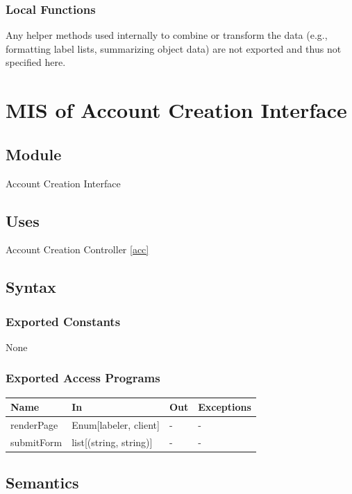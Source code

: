 \documentclass[12pt, titlepage]{article}
\begin{document}
    \subsubsection{Local Functions}
        Any helper methods used internally to combine or transform the data (e.g., formatting label lists, summarizing object data) are not exported and thus not specified here.


  
\section{MIS of Account Creation Interface} \label{aci}

\subsection{Module}

Account Creation Interface

\subsection{Uses}

Account Creation Controller \ref{acc}

\subsection{Syntax}

\subsubsection{Exported Constants}
None
\subsubsection{Exported Access Programs}

\begin{center}
\begin{tabular}{p{2cm} p{4cm} p{4cm} p{2cm}}
\hline
\textbf{Name} & \textbf{In} & \textbf{Out} & \textbf{Exceptions} \\
\hline
renderPage & Enum[labeler, client] & - & - \\
submitForm & list[(string, string)] & - & - \\
\hline
\end{tabular}
\end{center}

\subsection{Semantics}
\end{document}
